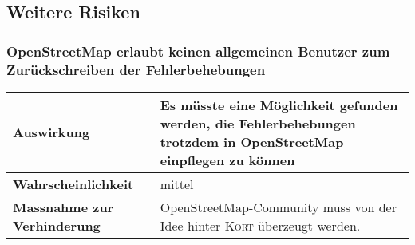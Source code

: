 \subsection{Weitere Risiken}

\subsubsection{OpenStreetMap erlaubt keinen allgemeinen Benutzer zum Zurückschreiben der Fehlerbehebungen}
\begin{table}[H]
\centering
\begin{tabular}{|p{0.25\twocelltabwidth}|p{0.75\twocelltabwidth}|}
\hline 
\small{\textbf{Auswirkung}} & Es müsste eine Möglichkeit gefunden werden, die Fehlerbehebungen trotzdem in OpenStreetMap einpflegen zu können \\
\hline 
\small{\textbf{Wahrscheinlichkeit}} & mittel \\
\hline 
\small{\textbf{Massnahme zur Verhinderung}} & OpenStreetMap-Community muss von der Idee hinter \textsc{Kort} überzeugt werden. \\
\hline
\end{tabular}
\end{table}